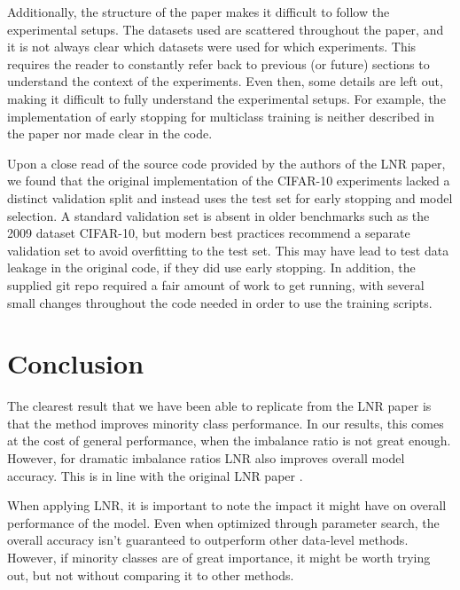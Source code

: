 \documentclass{article}
\begin{document}
Additionally, the structure of the paper makes it difficult to follow the experimental setups. The datasets used are scattered throughout the paper, and it is not always clear which datasets were used for which experiments. This requires the reader to constantly refer back to previous (or future) sections to understand the context of the experiments. Even then, some details are left out, making it difficult to fully understand the experimental setups. For example, the implementation of early stopping for multiclass training is neither described in the paper nor made clear in the code.

Upon a close read of the source code provided by the authors of the LNR paper, we found that the original implementation of the CIFAR-10 experiments lacked a distinct validation split and instead uses the test set for early stopping and model selection. A standard validation set is absent in older benchmarks such as the 2009 dataset CIFAR-10, but modern best practices recommend a separate validation set to avoid overfitting to the test set. This may have lead to test data leakage in the original code, if they did use early stopping.
In addition, the supplied git repo required a fair amount of work to get running, with several small changes throughout the code needed in order to use the training scripts.

\section{Conclusion}

The clearest result that we have been able to replicate from the LNR paper \cite{lnr} is that the method improves minority class performance. In our results, this comes at the cost of general performance, when the imbalance ratio is not great enough. However, for dramatic imbalance ratios LNR also improves overall model accuracy. This is in line with the original LNR paper \cite{lnr}.

When applying LNR, it is important to note the impact it might have on overall performance of the model. Even when optimized through parameter search, the overall accuracy isn't guaranteed to outperform other data-level methods. However, if minority classes are of great importance, it might be worth trying out, but not without comparing it to other methods.
\end{document}
